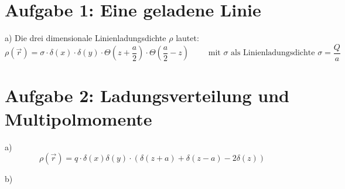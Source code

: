 \documentclass[11pt a4paper]{article}
\begin{document}
\thispagestyle{fancy}
\section*{Aufgabe 1: Eine geladene Linie}
\par{a)}
Die drei dimensionale Linienladungsdichte $\rho$ lautet:
\[
	\rho(\vec r) =
	\sigma \cdot \delta(x) \cdot \delta(y) \cdot \Theta\left( z + \frac a 2 \right)
	\cdot \Theta\left(\frac a 2 - z\right)
	\qquad \text{ mit } \sigma \text{ als Linienladungsdichte }
	\sigma = \frac Q a
\]


\newpage
\setlength{\headheight}{0cm}

\section*{Aufgabe 2: Ladungsverteilung und Multipolmomente}
\par{a)}
\[
	\rho (\vec r) = q \cdot \delta(x) \delta(y) \cdot \left(
	\delta(z+a) + \delta(z-a) - 2\delta(z) \right)
\]
\par{b)}
\end{document}
